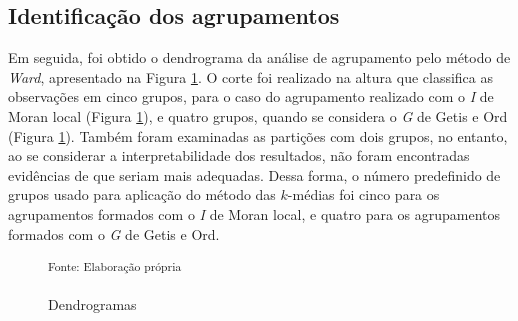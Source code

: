 \documentclass[
	12pt,				%
	openright,			%
	oneside,			%
	a4paper,			%
	chapter=TITLE,		%
	section=TITLE,		%
	english,			%
	french,				%
	spanish,			%
	brazil				%
	]{abntex2}
\begin{document}
\subsection{Identificação dos agrupamentos}

Em seguida, foi obtido o dendrograma da análise de agrupamento pelo método de \textit{Ward}, apresentado na Figura \ref{Dendrogramas}. O corte foi realizado na altura que classifica as observações em cinco grupos, para o caso do agrupamento realizado com o \textit{I} de Moran local (Figura \ref{Dendrogramas}), e quatro grupos, quando se considera o \textit{G} de Getis e Ord (Figura \ref{Dendrogramas}). Também foram examinadas as partições com dois grupos, no entanto, ao se considerar a interpretabilidade dos resultados, não foram encontradas evidências de que seriam mais adequadas. Dessa forma, o número predefinido de grupos usado para aplicação do método das $k$-médias foi cinco para os agrupamentos formados com o \textit{I} de Moran local, e quatro para os agrupamentos formados com o \textit{G} de Getis e Ord.

\begin{figure}[h]
	\caption{Dendrogramas}\label{Dendrogramas}
	\begin{center}
	\end{center}
	\noindent \small \textsuperscript{Fonte: Elaboração própria}
\end{figure}
\end{document}
